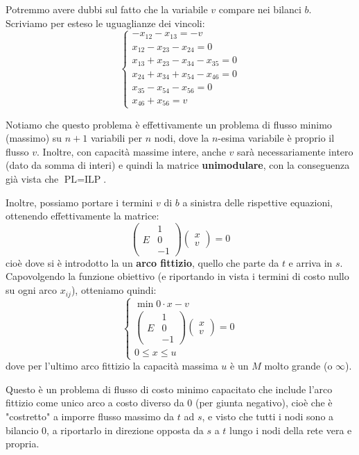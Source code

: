 \documentclass[a4paper,11pt]{article}
\begin{document}
Potremmo avere dubbi sul fatto che la  variabile $v$ compare nei bilanci $b$.
Scriviamo per esteso le uguaglianze dei vincoli:
\[
	\begin{cases}
		-x_{12} - x_{13} = -v \\ 
		x_{12} - x_{23} - x_{24} = 0 \\ 
		x_{13} + x_{23} - x_{34} - x_{35} = 0 \\ 
		x_{24} + x_{34} + x_{54} - x_{46} = 0 \\ 
		x_{35} - x_{54} - x_{56} = 0 \\ 
		x_{46} + x_{56} = v
	\end{cases}
\]

Notiamo che questo problema è effettivamente un problema di flusso minimo (massimo) su $n+1$ variabili per $n$ nodi, dove la $n$-esima variabile è proprio il flusso $v$.
Inoltre, con capacità massime intere, anche $v$ sarà necessariamente intero (dato da somma di interi) e quindi la matrice \textbf{unimodulare}, con la conseguenza già vista che $\text{PL} = \text{ILP}$.

Inoltre, possiamo portare i termini $v$ di $b$ a sinistra delle rispettive equazioni, ottenendo effettivamente la matrice:
$$
\begin{pmatrix}
 & 1 \\ 
E & 0 \\ 
 & -1
\end{pmatrix}
\begin{pmatrix}
x \\ v
\end{pmatrix}
= 0
$$
cioè dove si è introdotto la un \textbf{arco fittizio}, quello che parte da $t$ e arriva in $s$.
Capovolgendo la funzione obiettivo (e riportando in vista i termini di costo nullo su ogni arco $x_{ij}$), otteniamo quindi:
\[
	\begin{cases}
		\min 0 \cdot x - v \\ 	
\begin{pmatrix}
 & 1 \\ 
E & 0 \\ 
 & -1
\end{pmatrix}
\begin{pmatrix}
x \\ v
\end{pmatrix}
= 0 \\ 
0 \leq x \leq u
	\end{cases}
\]
dove per l'ultimo arco fittizio la capacità massima $u$ è un $M$ molto grande (o $\infty$).

Questo è un problema di flusso di costo minimo capacitato che include l'arco fittizio come unico arco a costo diverso da 0 (per giunta negativo), cioè che è "costretto" a imporre flusso massimo da $t$ ad $s$, e visto che tutti i nodi sono a bilancio 0, a riportarlo in direzione opposta da $s$ a $t$ lungo i nodi della rete vera e propria.
\end{document}
